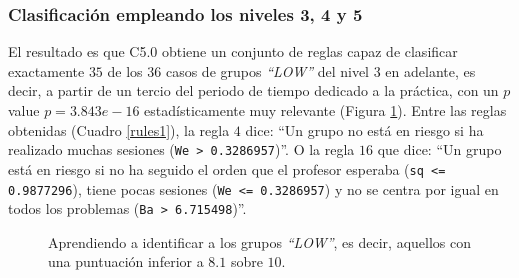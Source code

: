 \subsubsection{Clasificación empleando los niveles 3, 4 y 5}

El resultado es que C5.0 obtiene un conjunto de reglas capaz de clasificar exactamente $35$ de los $36$ casos de grupos \emph{``LOW''} del nivel $3$ en adelante, es decir, a partir de un tercio del periodo de tiempo dedicado a la práctica, con un $p$ value $p = 3.843e-16$ estadísticamente muy relevante (Figura \ref{fig:cm1}). Entre las reglas obtenidas (Cuadro \ref{rules1}), la regla $4$ dice: ``Un grupo no está en riesgo si ha realizado muchas sesiones (\texttt{We > 0.3286957})''. O la regla $16$ que dice: ``Un grupo está en riesgo si no ha seguido el orden que el profesor esperaba (\texttt{sq <= 0.9877296}), tiene pocas sesiones (\texttt{We <= 0.3286957}) y no se centra por igual en todos los problemas (\texttt{Ba > 6.715498})''. %

\begin{figure}[H]
\centering
{}
\caption{Aprendiendo a identificar a los grupos \emph{``LOW''}, es decir, aquellos con una puntuación inferior a $8.1$ sobre $10$.}
\label{fig:cm1}
\end{figure}

